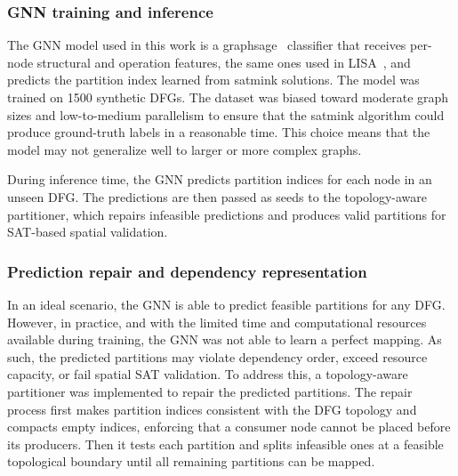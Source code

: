 \subsubsection{GNN training and inference}

The GNN model used in this work is a \gls{graphsage}~\cite{hamilton2017inductive} classifier that receives per-node structural and operation features, the same ones used in LISA~\cite{lisa2022}, and predicts the partition index learned from \gls{satmink} solutions. The model was trained on 1500 synthetic DFGs. The dataset was biased toward moderate graph sizes and low-to-medium parallelism to ensure that the \gls{satmink} algorithm could produce ground-truth labels in a reasonable time. This choice means that the model may not generalize well to larger or more complex graphs.

During inference time, the GNN predicts partition indices for each node in an unseen DFG\@. The predictions are then passed as seeds to the topology-aware partitioner, which repairs infeasible predictions and produces valid partitions for SAT-based spatial validation.

%
%

\subsubsection{Prediction repair and dependency representation}

In an ideal scenario, the GNN is able to predict feasible partitions for any DFG\@. However, in practice, and with the limited time and computational resources available during training, the GNN was not able to learn a perfect mapping. As such, the predicted partitions may violate dependency order, exceed resource capacity, or fail spatial SAT validation. To address this, a topology-aware partitioner was implemented to repair the predicted partitions. The repair process first makes partition indices consistent with the DFG topology and compacts empty indices, enforcing that a consumer node cannot be placed before its producers. Then it tests each partition and splits infeasible ones at a feasible topological boundary until all remaining partitions can be mapped.

